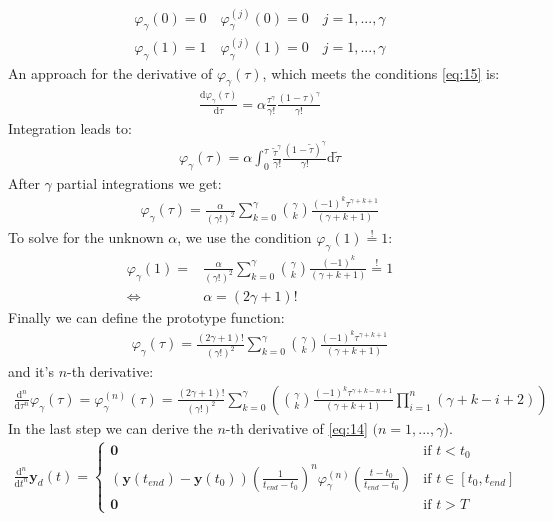 \documentclass[a4paper,11pt,headings=standardclasses]{scrartcl}%
\renewcommand{\d}{\mathrm{d}} %
\newcommand{\py}{\emph{Python}\,}
\begin{document}
\begin{subequations}
\label{eq:15}
\begin{align}
\varphi_\gamma(0)=0 \quad \varphi^{(j)}_\gamma(0)=0 \quad j = 1,...,\gamma \\
\varphi_\gamma(1)=1 \quad \varphi^{(j)}_\gamma(1)=0 \quad j = 1,...,\gamma 
\end{align}
\end{subequations}
An approach for the derivative of $\varphi_\gamma(\tau)$, which meets the conditions \eqref{eq:15} is:
\begin{align}
\frac{\d \varphi_\gamma(\tau)}{\d \tau} = \alpha \frac{\tau^{\gamma}}{\gamma!}\frac{(1-\tau)^{\gamma}}{\gamma!}
\end{align}
Integration leads to:
\begin{align}
\varphi_\gamma(\tau) = \alpha \int_0^\tau\frac{\tilde{\tau}^{\gamma}}{\gamma!}\frac{(1-\tilde{\tau})^{\gamma}}{\gamma!} \d \tilde{\tau}
\end{align}
After $\gamma$ partial integrations we get:
\begin{align*}
\varphi_\gamma(\tau)= \frac{\alpha}{(\gamma!)^2} \sum_{k=0}^{\gamma} \binom{\gamma}{k} \frac{(-1)^k\tau^{\gamma+k+1}}{(\gamma+k+1)}
\end{align*}
To solve for the unknown $\alpha$, we use the condition $\varphi_\gamma(1)\overset{!}{=}1$:
\begin{align*}
\varphi_\gamma(1)= &\frac{\alpha}{(\gamma!)^2} \sum_{k=0}^{\gamma} \binom{\gamma}{k} \frac{(-1)^k}{(\gamma+k+1)} \overset{!}{=} 1 \\
\Leftrightarrow \quad & \alpha = (2\gamma+1)!
\end{align*}
Finally we can define the prototype function:
\begin{align}
\varphi_\gamma(\tau)= \frac{(2\gamma+1)!}{(\gamma!)^2} \sum_{k=0}^{\gamma} \binom{\gamma}{k} \frac{(-1)^k\tau^{\gamma+k+1}}{(\gamma+k+1)}
\end{align}
and it's $n$-th derivative:
\begin{align}
\frac{\d^n }{\d \tau^n}\varphi_\gamma(\tau)=\varphi_\gamma^{(n)}(\tau)= \frac{(2\gamma+1)!}{(\gamma!)^2} \sum_{k=0}^{\gamma} \left(\binom{\gamma}{k} \frac{(-1)^k\tau^{\gamma+k-n+1}}{(\gamma+k+1)}\prod_{i=1}^n(\gamma+k-i+2)\right)
\end{align}
In the last step we can derive the $n$-th derivative of \eqref{eq:14} $(n=1,...,\gamma$).
\begin{align}
\frac{\d^n}{\d t^n}\mathbf{y}_d(t) = \begin{cases} \mathbf{0}&\textrm{if } t<t_0 \\ (\mathbf{y}(t_{end})-\mathbf{y}(t_0))\left(\frac{1}{t_{end}-t_0}\right)^n\varphi_\gamma^{(n)}\left(\frac{t-t_0}{t_{end}-t_0}\right) &\textrm{if } t \in [t_0, t_{end}] \\ \mathbf{0}&\textrm{if } t>T\end{cases}
\end{align}
\end{document}
